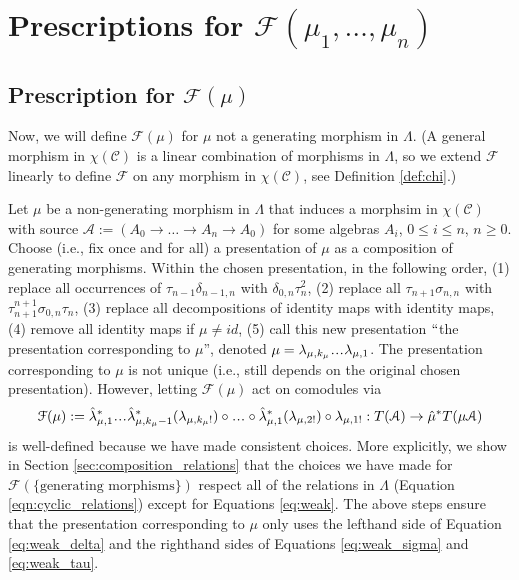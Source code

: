 \section{Prescriptions for 
$\mathcal{F}(\mu_1, \dots, \mu_n)$} 

\subsection{Prescription for $\mathcal{F}(\mu)$} \label{sec:F_of_mu}
Now, we will define $\mathcal{F}(\mu)$ for 
$\mu$ not a generating morphism in $\Lambda$. 
(A general morphism in $\chi(\mathcal{C})$ is a 
linear combination of morphisms in $\Lambda$, so 
we extend $\mathcal{F}$ linearly to define 
$\mathcal{F}$ on any morphism in $\chi(\mathcal{C})$, 
see Definition \ref{def:chi}.)

Let $\mu$ be a non-generating morphism 
in $\Lambda$ that induces a morphsim in 
$\chi(\mathcal{C})$ with source $\mathcal{A} :=
(A_0 \to \dots \to A_n \to A_0)$ for some 
algebras $A_i$, $0 \leq i \leq n$, $n \geq 0$. 
Choose (i.e., fix once and 
for all) a presentation of $\mu$ as a 
composition of generating morphisms. 
Within the chosen presentation, in the 
following order, (1) replace 
all occurrences of $\tau_{n-1} \delta_{n-1,n}$ 
with $\delta_{0,n}\tau_n^2$, (2) replace all 
$\tau_{n+1}\sigma_{n,n}$ with 
$\tau_{n+1}^{n+1}\sigma_{0,n}\tau_n$, 
(3) replace all decompositions of identity 
maps with identity maps, (4) remove all 
identity maps if $\mu \neq id$, (5) call 
this new presentation 
$``$the presentation corresponding to $\mu$'', 
denoted $\mu = \lambda_{\mu,k_\mu}\smdots 
\lambda_{\mu,1}$. The presentation 
corresponding to $\mu$ is not unique (i.e., 
still depends on the original chosen 
presentation). However, letting $\mathcal{F}(\mu)$ 
act on comodules via
\begin{align*}
\mathcal{F}(\mu) := 
\hat{\lambda}_{\mu,1}^*\smdots
  \hat{\lambda}_{\mu,k_\mu-1}^*
  (\lambda_{\mu,k_\mu!})
  \circ \smdots \circ
  \hat{\lambda}_{\mu,1}^*(\lambda_{\mu,2!})
  \circ \lambda_{\mu,1!}: 
  T(\mathcal{A})
  \to \hat{\mu}^*T(\mu \mathcal{A})
\end{align*}
is well-defined because we have made 
consistent choices. More explicitly, 
we show in Section 
\ref{sec:composition_relations} that
the choices we have made for 
$\mathcal{F}(\{ 
\textrm{generating morphisms}\})$ 
respect all of the relations in $\Lambda$ 
(Equation \ref{eqn:cyclic_relations}) 
except for Equations \ref{eq:weak}. 
The above steps ensure that the 
presentation corresponding 
to $\mu$ only uses the lefthand 
side of Equation \ref{eq:weak_delta} and 
the righthand sides of Equations 
\ref{eq:weak_sigma} and \ref{eq:weak_tau}.
%
